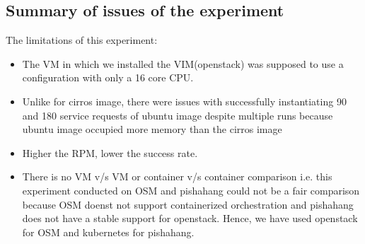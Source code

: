 




\subsection{Summary of issues of the experiment}

The limitations of this experiment:

\begin{itemize}
	\item The VM in which we installed the VIM(openstack) was supposed to use a configuration with only a 16 core CPU. 
	\item Unlike for cirros image, there were issues with successfully instantiating 90 and 180 service requests of ubuntu image despite multiple runs because ubuntu image occupied more memory than the cirros image
	 \item Higher the RPM, lower the success rate.
	\item There is no VM v/s VM or container v/s container comparison i.e. this experiment conducted on OSM and pishahang could not be a fair comparison because OSM doenst not support containerized orchestration and pishahang does not have a stable support for openstack. Hence, we have used openstack for OSM and kubernetes for pishahang.
	
\end{itemize}



